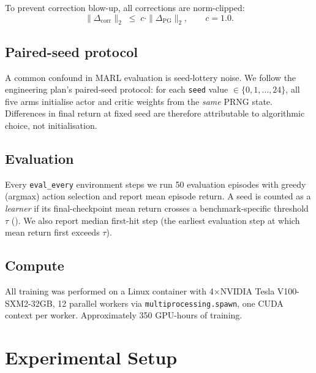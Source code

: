 \documentclass[11pt,a4paper]{article}
\newcommand{\thr}{\tau}
\begin{document}
To prevent correction blow-up, all corrections are norm-clipped:
\begin{equation}
    \|\Delta_{\text{corr}}\|_2 \;\leq\; c \cdot \|\Delta_{\text{PG}}\|_2, \qquad c = 1.0.
\end{equation}

\subsection{Paired-seed protocol}

A common confound in MARL evaluation is seed-lottery noise.
We follow the engineering plan's paired-seed protocol: for each \texttt{seed} value $\in \{0, 1, \ldots, 24\}$, all five arms initialise actor and critic weights from the \emph{same} PRNG state.
Differences in final return at fixed seed are therefore attributable to algorithmic choice, not initialisation.

\subsection{Evaluation}

Every \texttt{eval\_every} environment steps we run 50 evaluation episodes with greedy (argmax) action selection and report mean episode return.
A seed is counted as a \emph{learner} if its final-checkpoint mean return crosses a benchmark-specific threshold $\thr$ ().
We also report median first-hit step (the earliest evaluation step at which mean return first exceeds $\thr$).

\subsection{Compute}

All training was performed on a Linux container with 4$\times$NVIDIA Tesla V100-SXM2-32GB, 12 parallel workers via \texttt{multiprocessing.spawn}, one CUDA context per worker.
Approximately 350 GPU-hours of training.

\section{Experimental Setup}\label{sec:setup}
\end{document}
